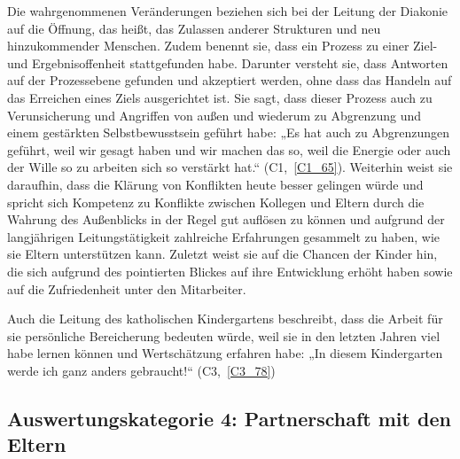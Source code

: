Die wahrgenommenen Veränderungen beziehen sich bei der Leitung der Diakonie auf die Öffnung, das heißt, das Zulassen anderer Strukturen und neu hinzukommender Menschen. Zudem benennt sie, dass ein Prozess zu einer Ziel- und Ergebnisoffenheit stattgefunden habe. Darunter versteht sie, dass Antworten auf der Prozessebene gefunden und akzeptiert werden, ohne dass das Handeln auf das Erreichen eines Ziels ausgerichtet ist. Sie sagt, dass dieser Prozess auch zu Verunsicherung und Angriffen von außen und wiederum zu Abgrenzung und einem gestärkten Selbstbewusstsein geführt habe: „Es hat auch zu Abgrenzungen geführt, weil wir gesagt haben und wir machen das so, weil die Energie oder auch der Wille so zu arbeiten sich so verstärkt hat.“ (C1,~\ref{C1_65}). Weiterhin weist sie daraufhin, dass die Klärung von Konflikten heute besser gelingen würde und spricht sich Kompetenz zu Konflikte zwischen Kollegen und Eltern durch die Wahrung des Außenblicks in der Regel gut auflösen zu können und aufgrund der langjährigen Leitungstätigkeit zahlreiche Erfahrungen gesammelt zu haben, wie sie Eltern unterstützen kann. Zuletzt weist sie auf die Chancen der Kinder hin, die sich aufgrund des pointierten Blickes auf ihre Entwicklung erhöht haben sowie auf die Zufriedenheit unter den Mitarbeiter.

Auch die Leitung des katholischen Kindergartens beschreibt, dass die Arbeit für sie persönliche Bereicherung bedeuten würde, weil sie in den letzten Jahren viel habe lernen können und Wertschätzung erfahren habe: „In diesem Kindergarten werde ich ganz anders gebraucht!“ (C3,~\ref{C3_78}) 

\subsection{Auswertungskategorie 4: Partnerschaft mit den Eltern}


